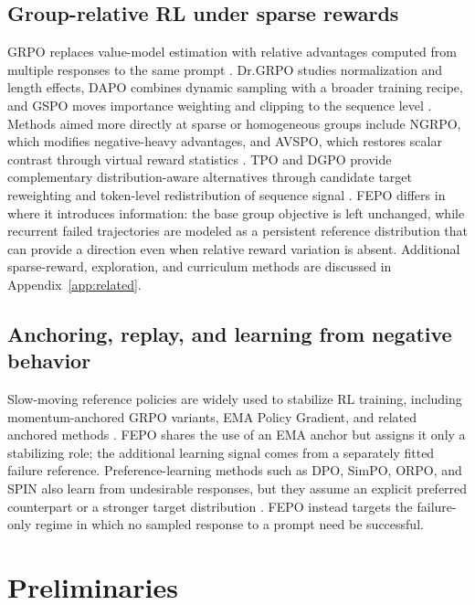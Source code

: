 \documentclass{article}
\newcommand{\FEPO}{\textsc{FEPO}\xspace}
\begin{document}
\subsection{Group-relative RL under sparse rewards}
GRPO replaces value-model estimation with relative advantages computed from multiple responses to the same prompt \citep{deepseekmath2024}. Dr.GRPO studies normalization and length effects, DAPO combines dynamic sampling with a broader training recipe, and GSPO moves importance weighting and clipping to the sequence level \citep{liu2025understanding,yu2025dapo,zheng2025gspo}. Methods aimed more directly at sparse or homogeneous groups include NGRPO, which modifies negative-heavy advantages, and AVSPO, which restores scalar contrast through virtual reward statistics \citep{nan2025ngrpo,he2026avspo}. TPO and DGPO provide complementary distribution-aware alternatives through candidate target reweighting and token-level redistribution of sequence signal \citep{kaddour2026tpo,jin2026dgpo}. \FEPO differs in where it introduces information: the base group objective is left unchanged, while recurrent failed trajectories are modeled as a persistent reference distribution that can provide a direction even when relative reward variation is absent. Additional sparse-reward, exploration, and curriculum methods are discussed in Appendix~\ref{app:related}.

\subsection{Anchoring, replay, and learning from negative behavior}
Slow-moving reference policies are widely used to stabilize RL training, including momentum-anchored GRPO variants, EMA Policy Gradient, and related anchored methods \citep{mgrpo2025,emappg2026,apo2026,polyak1992averaging}. \FEPO shares the use of an EMA anchor but assigns it only a stabilizing role; the additional learning signal comes from a separately fitted failure reference. Preference-learning methods such as DPO, SimPO, ORPO, and SPIN also learn from undesirable responses, but they assume an explicit preferred counterpart or a stronger target distribution \citep{rafailov2023dpo,meng2024simpo,hong2024orpo,chen2024spin}. \FEPO instead targets the failure-only regime in which no sampled response to a prompt need be successful.

\section{Preliminaries}
\label{sec:prelim}
\end{document}
